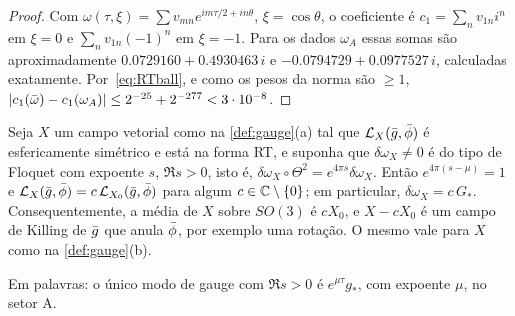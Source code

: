 \begin{proof}
Com $\omega(\tau,\xi)=\sum v_{mn}e^{im\tau/2+in\theta}$, $\xi=\cos\theta$, o coeficiente é
$c_1=\sum_nv_{1n}i^n$ em $\xi=0$ e $\sum_nv_{1n}(-1)^n$ em $\xi=-1$. Para os dados $\omega_A$ essas somas são
aproximadamente $0.0729160+0.4930463\,i$ e $-0.0794729+0.0977527\,i$, calculadas exatamente. Por~\eqref{eq:RTball},
e como os pesos da norma são $\ge1$, $|c_1(\bar\omega)-c_1(\omega_A)|\le2^{-25}+2^{-277}<3\cdot10^{-8}$.
\end{proof}

\begin{lemma}\label{lem:gauge}
Seja $X$ um campo vetorial como na \cref{def:gauge}\textup{(a)} tal que $\mathcal{L}_X(\bar g,\bar\phi)$ é esfericamente
simétrico e está na forma RT,
e suponha que $\delta\omega_X\neq0$ é do tipo de Floquet com expoente $s$, $\Re s>0$, isto é,
$\delta\omega_X\circ\Theta^2=e^{4\pi s}\delta\omega_X$. Então $e^{4\pi(s-\mu)}=1$ e
$\mathcal{L}_X(\bar g,\bar\phi)=c\,\mathcal{L}_{X_0}(\bar g,\bar\phi)$ para algum $c\in\mathbb{C}\setminus\{0\}$; em particular,
$\delta\omega_X=c\,G_*$. Consequentemente, a média de $X$ sobre $SO(3)$ é $cX_0$, e $X-cX_0$ é um campo de Killing de
$\bar g$ que anula $\bar\phi$, por exemplo uma rotação. O mesmo vale para $X$ como na
\cref{def:gauge}\textup{(b)}.
\end{lemma}

Em palavras: o único modo de gauge com $\Re s>0$ é $e^{\mu\tau}g_*$, com expoente $\mu$, no setor A.

